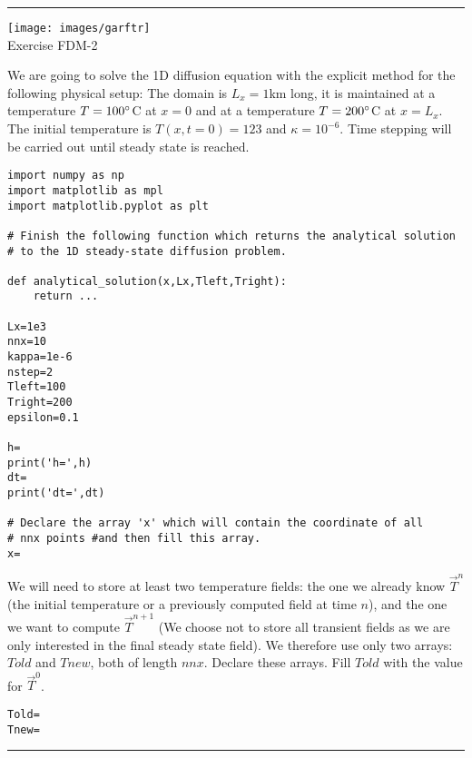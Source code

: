 \begin{center}
\begin{minipage}[t]{0.77\textwidth}
\par\noindent\rule{\textwidth}{0.4pt}

\begin{center}
\texttt{[image: images/garftr]} \\
{\color{orange}Exercise FDM-2}
\end{center}

We are going to solve the 1D diffusion equation with the explicit method
for the following physical setup: The domain is $L_x=1$km long, 
it is maintained at a temperature $T=100\degree$C at $x=0$ and at a temperature
$T=200\degree$C at $x=L_x$. The initial temperature is $T(x,t=0)=123$
and $\kappa=10^{-6}$. 
Time stepping will be carried out until steady state is reached.

\begin{verbatim}
import numpy as np
import matplotlib as mpl
import matplotlib.pyplot as plt

# Finish the following function which returns the analytical solution 
# to the 1D steady-state diffusion problem.

def analytical_solution(x,Lx,Tleft,Tright):
    return ...

Lx=1e3
nnx=10
kappa=1e-6
nstep=2
Tleft=100
Tright=200
epsilon=0.1

h=
print('h=',h)
dt=
print('dt=',dt)

# Declare the array 'x' which will contain the coordinate of all 
# nnx points #and then fill this array.
x=

\end{verbatim}

We will need to store at least two temperature fields: the one we already know $\vec{T}^n$ (the initial temperature or a previously computed field at time $n$), and the one we want to compute $\vec{T}^{n+1}$ 
(We choose not to store all transient fields as we are only interested in the final steady state field). We therefore use only two arrays: $Told$ and $Tnew$, both of length $nnx$. Declare these arrays. Fill $Told$ with the value for $\vec{T}^0$.

\begin{verbatim}
Told=
Tnew=
\end{verbatim}

\par\noindent\rule{\textwidth}{0.4pt}
\end{minipage}
\end{center}

